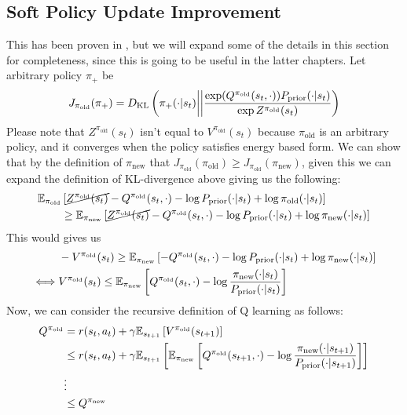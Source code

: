 \subsection{Soft Policy Update Improvement}
\label{appx:chap2-soft-policy-update-improvement}
This has been proven in \cite{haarnoja2018softa}, but we will expand some of the details in this section for completeness, since this is going to be useful in the latter chapters. Let arbitrary policy $\pi_+$ be 
\begin{equation}
    J_{\pi_{\text{old}}}(\pi_+) = D_{\mathrm{KL}}\left( \pi_+(\cdot | s_t) \bigg|\bigg| \frac{\exp(Q^{\pi_{\text{old}}}(s_t, \cdot)) P_{\text{prior}}(\cdot | s_t)}{\exp Z^{\pi_{\text{old}}}(s_t)} \right)
\end{equation}
Please note that $Z^{\pi_{\text{old}}}(s_t)$ isn't equal to $V^{\pi_\text{old}}(s_t)$ because $\pi_{\text{old}}$ is an arbitrary policy, and it converges when the policy satisfies energy based form. We can show that by the definition of $\pi_{\text{new}}$ that $J_{\pi_{\text{old}}}(\pi_\text{old}) \ge J_{\pi_{\text{old}}}(\pi_\text{new})$, given this we can expand the definition of KL-divergence above giving us the following:
\begin{equation}
\begin{aligned}
    \mathbb{E}_{\pi_{\text{old}}}&\left[ \cancel{Z^{\pi_{\text{old}}}(s_t)} - Q^{\pi_{\text{old}}}(s_t, \cdot) - \log P_{\text{prior}}(\cdot | s_t) + \log \pi_{\text{old}}(\cdot | s_t) \right] \\
    &\ge\mathbb{E}_{\pi_{\text{new}}}\left[ \cancel{Z^{\pi_{\text{old}}}(s_t)} - Q^{\pi_{\text{old}}}(s_t, \cdot) - \log P_{\text{prior}}(\cdot | s_t) + \log \pi_{\text{new}}(\cdot | s_t) \right]
\end{aligned}
\end{equation}
This would gives us 
\begin{equation}
\begin{aligned}
    &-V^{\pi_{\text{old}}}(s_t) \ge \mathbb{E}_{\pi_{\text{new}}}\left[  - Q^{\pi_{\text{old}}}(s_t, \cdot) - \log P_{\text{prior}}(\cdot | s_t) + \log \pi_{\text{new}}(\cdot | s_t) \right] \\
    \iff&V^{\pi_{\text{old}}}(s_t) \le \mathbb{E}_{\pi_{\text{new}}}\left[  Q^{\pi_{\text{old}}}(s_t, \cdot) - \log \frac{\pi_{\text{new}}(\cdot | s_t)}{P_{\text{prior}}(\cdot | s_t)} \right]
\end{aligned}
\end{equation}
Now, we can consider the recursive definition of Q learning as follows:
\begin{equation}
\begin{aligned}
    Q^{\pi_{\text{old}}} &= r(s_t, a_t) + \gamma\mathbb{E}_{s_{t+1}}\left[ V^{\pi_{\text{old}}}(s_{t+1}) \right] \\
    &\le r(s_t, a_t) + \gamma\mathbb{E}_{s_{t+1}}\left[ \mathbb{E}_{\pi_{\text{new}}}\left[  Q^{\pi_{\text{old}}}(s_{t+1}, \cdot) - \log \frac{\pi_{\text{new}}(\cdot | s_{t+1})}{P_{\text{prior}}(\cdot | s_{t+1})} \right] \right] \\
    &\vdots \\
    &\le Q^{\pi_{\text{new}}}
\end{aligned}
\end{equation}